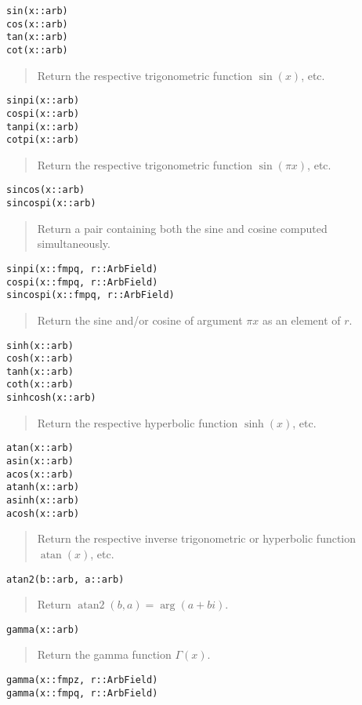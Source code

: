 \documentclass[a4paper,10pt]{article}
\newcommand{\desc}[1]{\vspace{-3mm}\begin{quote}#1\end{quote}}
\begin{document}
{{\begin{lstlisting}
sin(x::arb)
cos(x::arb)
tan(x::arb)
cot(x::arb)
\end{lstlisting}

\desc{Return the respective trigonometric function $\sin(x)$, etc.}

\begin{lstlisting}
sinpi(x::arb)
cospi(x::arb)
tanpi(x::arb)
cotpi(x::arb)
\end{lstlisting}

\desc{Return the respective trigonometric function $\sin(\pi x)$, etc.}

\begin{lstlisting}
sincos(x::arb)
sincospi(x::arb)
\end{lstlisting}

\desc{Return a pair containing both the sine and cosine computed simultaneously.}

\begin{lstlisting}
sinpi(x::fmpq, r::ArbField)
cospi(x::fmpq, r::ArbField)
sincospi(x::fmpq, r::ArbField)
\end{lstlisting}

\desc{Return the sine and/or cosine of argument $\pi x$ as an element of $r$.}

\begin{lstlisting}
sinh(x::arb)
cosh(x::arb)
tanh(x::arb)
coth(x::arb)
sinhcosh(x::arb)
\end{lstlisting}

\desc{Return the respective hyperbolic function $\sinh(x)$, etc.}

\begin{lstlisting}
atan(x::arb)
asin(x::arb)
acos(x::arb)
atanh(x::arb)
asinh(x::arb)
acosh(x::arb)
\end{lstlisting}

\desc{Return the respective inverse trigonometric or hyperbolic function
$\operatorname{atan}(x)$, etc.}

\begin{lstlisting}
atan2(b::arb, a::arb)
\end{lstlisting}

\desc{Return $\operatorname{atan2}(b,a) = \arg(a+bi)$.}

\begin{lstlisting}
gamma(x::arb)
\end{lstlisting}

\desc{Return the gamma function $\Gamma(x)$.}

\begin{lstlisting}
gamma(x::fmpz, r::ArbField)
gamma(x::fmpq, r::ArbField)
\end{lstlisting}

}}
\end{document}
